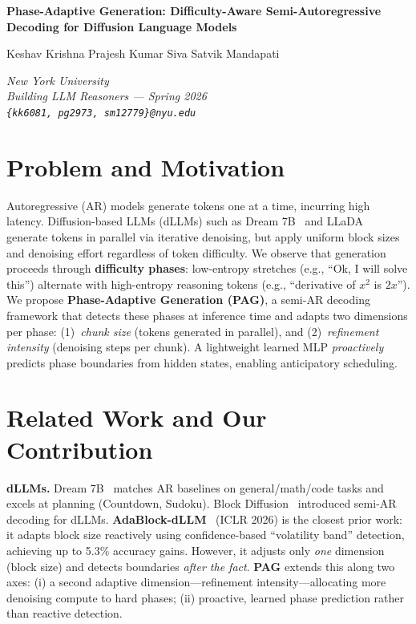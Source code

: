 \documentclass[11pt]{article}
\newcommand{\papertitle}[1]{%
  \begin{center}
    {\LARGE\bfseries #1 \par}
    \vspace{0.3em}
  \end{center}
}
\newcommand{\paperauthor}[1]{%
  \begin{center}
    {\large #1 \par}
    \vspace{0.15em}
  \end{center}
}
\newcommand{\paperaffiliation}[1]{%
  \begin{center}
    {\normalsize\itshape #1 \par}
    \vspace{0.6em}
  \end{center}
}
\begin{document}
\papertitle{Phase-Adaptive Generation: Difficulty-Aware Semi-Autoregressive Decoding for Diffusion Language Models}

\paperauthor{Keshav Krishna \quad Prajesh Kumar \quad Siva Satvik Mandapati}
\paperaffiliation{New York University \\ Building LLM Reasoners --- Spring 2026 \\ \texttt{\{kk6081, pg2973, sm12779\}@nyu.edu}}

\section{Problem and Motivation}

Autoregressive (AR) models generate tokens one at a time, incurring high latency. Diffusion-based LLMs (dLLMs) such as Dream 7B~\citep{ye2025dream} and LLaDA~\citep{nie2025llada} generate tokens in parallel via iterative denoising, but apply uniform block sizes and denoising effort regardless of token difficulty. We observe that generation proceeds through \textbf{difficulty phases}: low-entropy stretches (e.g., ``Ok, I will solve this'') alternate with high-entropy reasoning tokens (e.g., ``derivative of $x^2$ is $2x$''). We propose \textbf{Phase-Adaptive Generation (PAG)}, a semi-AR decoding framework that detects these phases at inference time and adapts two dimensions per phase: (1)~\textit{chunk size} (tokens generated in parallel), and (2)~\textit{refinement intensity} (denoising steps per chunk). A lightweight learned MLP \textit{proactively} predicts phase boundaries from hidden states, enabling anticipatory scheduling.

\section{Related Work and Our Contribution}

\textbf{dLLMs.} Dream 7B~\citep{ye2025dream} matches AR baselines on general/math/code tasks and excels at planning (Countdown, Sudoku). Block Diffusion~\citep{arriola2025block} introduced semi-AR decoding for dLLMs.
\textbf{AdaBlock-dLLM}~\citep{lu2025adablock} (ICLR 2026) is the closest prior work: it adapts block size reactively using confidence-based ``volatility band'' detection, achieving up to 5.3\% accuracy gains. However, it adjusts only \textit{one} dimension (block size) and detects boundaries \textit{after the fact}.
\textbf{PAG} extends this along two axes: (i) a second adaptive dimension---refinement intensity---allocating more denoising compute to hard phases; (ii) proactive, learned phase prediction rather than reactive detection.
\end{document}
